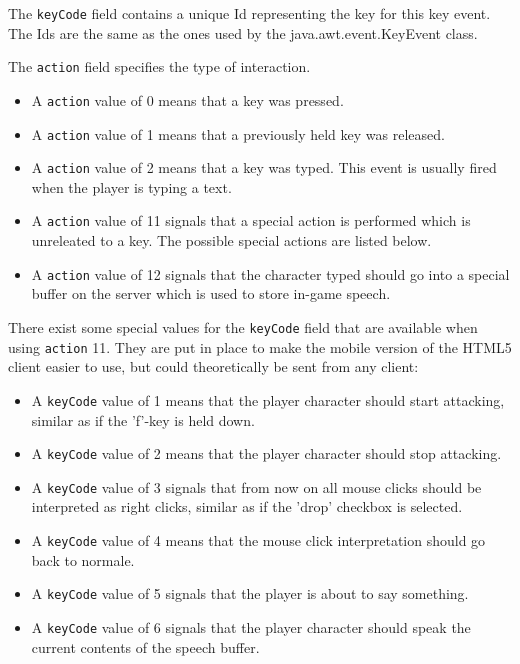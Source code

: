 \documentclass{article}
\newcommand{\field}[1]{\textcolor{fieldColor}{\texttt{#1}}}
\begin{document}
The \field{keyCode} field contains a unique Id representing the key for this key event. The Ids are the same as the ones used by the java.awt.event.KeyEvent class.

The \field{action} field specifies the type of interaction.
\begin{itemize}
\item A \field{action} value of 0 means that a key was pressed.
\item A \field{action} value of 1 means that a previously held key was released.
\item A \field{action} value of 2 means that a key was typed. This event is usually fired when the player is typing a text.
\item A \field{action} value of 11 signals that a special action is performed which is unreleated to a key. The possible special actions are listed below.
\item A \field{action} value of 12 signals that the character typed should go into a special buffer on the server which is used to store in-game speech.
\end{itemize}

There exist some special values for the \field{keyCode} field that are available when using \field{action} 11. They are put in place to make the mobile version of the HTML5 client easier to use, 
but could theoretically be sent from any client:
\begin{itemize}
\item A \field{keyCode} value of 1 means that the player character should start attacking, similar as if the 'f'-key is held down.
\item A \field{keyCode} value of 2 means that the player character should stop attacking.
\item A \field{keyCode} value of 3 signals that from now on all mouse clicks should be interpreted as right clicks, similar as if the 'drop' checkbox is selected.
\item A \field{keyCode} value of 4 means that the mouse click interpretation should go back to normale.
\item A \field{keyCode} value of 5 signals that the player is about to say something.
\item A \field{keyCode} value of 6 signals that the player character should speak the current contents of the speech buffer.
\end{itemize}
\end{document}
